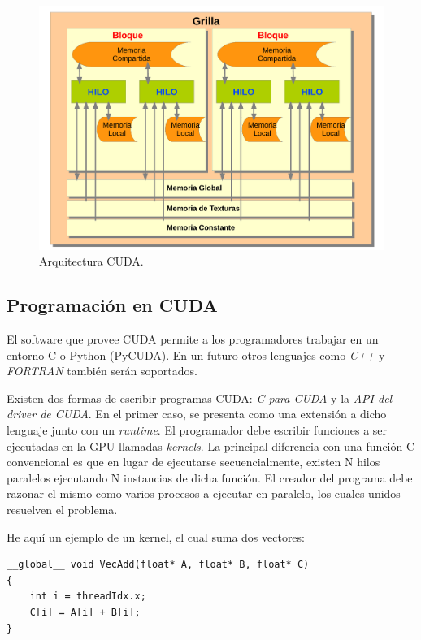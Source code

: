 \begin{figure}[h]
\begin{center}
\includegraphics[width=13cm]{figures/cuda}
\end{center}
\caption{Arquitectura CUDA.}
\label{fg:cuda}
\end{figure}


\subsection{Programación en CUDA}
El software que provee CUDA permite a los programadores trabajar en un entorno C o Python (PyCUDA).
En un futuro otros lenguajes como {\em C++} y {\em FORTRAN} tambi\'en ser\'an soportados. 

Existen dos formas de escribir programas CUDA: {\em C para CUDA} y la {\em API del driver de CUDA}.
En el primer caso, se presenta como una extensi\'on a dicho lenguaje junto con un {\em runtime}.
El programador debe escribir funciones a ser ejecutadas en la GPU llamadas {\em kernels}. 
La principal diferencia con una funci\'on C convencional es que en lugar de ejecutarse secuencialmente, existen N hilos paralelos ejecutando N instancias de dicha funci\'on. 
El creador del programa debe razonar el mismo como varios procesos a ejecutar en paralelo, los cuales unidos resuelven el problema.

He aqu\'i un ejemplo de un kernel, el cual suma dos vectores:

\begin{verbatim}
__global__ void VecAdd(float* A, float* B, float* C)
{
    int i = threadIdx.x;
    C[i] = A[i] + B[i];
}
\end{verbatim}

